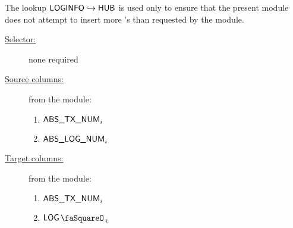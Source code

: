 The lookup $\textsf{LOGINFO} \hookrightarrow \textsf{HUB}$
is used only to ensure that the present module does not attempt to insert more 's than requested by the \hubMod{} module.
\begin{description}
	\item[\underline{Selector:}]
		none required
	\item[\underline{Source columns:}]
		from the \logInfoMod{} module:
		\begin{multicols}{2}
			\begin{enumerate}
				\item $\textsf{ABS\_TX\_NUM}_{i}$
				\item $\textsf{ABS\_LOG\_NUM}_{i}$
			\end{enumerate}
		\end{multicols}
	\item[\underline{Target columns:}]
		from the \hubMod{} module: 
		\begin{multicols}{2}
			\begin{enumerate}
				\item $\textsf{ABS\_TX\_NUM}_{i}$
				\item $\logStamp_{i}$
			\end{enumerate} 
		\end{multicols}
\end{description}
